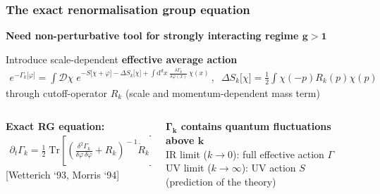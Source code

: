 \documentclass[]{beamer}  %
\begin{document}
\begin{frame}
  \frametitle{The exact renormalisation group equation}

  \begin{center}
    \textbf{
      Need non-perturbative tool for strongly interacting regime $\mathbf{g>1}$
    }
  \end{center}

  Introduce scale-dependent \textbf{effective average action}
  \begin{align*}
    e^{ - \Gamma_k \lbrack \varphi \rbrack }
    = \int \mathcal D \chi \;
    e^{
      - S \lbrack \chi + \varphi \rbrack
      - \Delta S_k \lbrack \chi \rbrack
      + \int \mathrm d^dx \;
      \frac{ \delta \Gamma_k }{ \delta \varphi (x) }
      \, \chi(x)
    } \,, \;\;
   \Delta S_k \lbrack \chi \rbrack =
   \frac 12 \int \chi(-p) R_k(p) \chi(p)
  \end{align*}
  through cutoff-operator $R_k$ (scale and momentum-dependent mass term)

  \vspace{30pt}
  \begin{columns}[T]
    \begin{column}{.5\textwidth}
      \textbf{Exact RG equation:}\\[3pt]
      \begin{align*}
        \boxed{
          \partial_t \Gamma_k
          = \frac 12 \; \mathrm{Tr}
          \left[
            \left(
              \frac{ \delta^2 \Gamma_k }{ \delta \varphi \, \delta \varphi } + R_k
            \right) ^{\!\!-1}
            \! \dot R_k
          \right]
        }
      \end{align*}
      \hfill [Wetterich `93, Morris `94]
    \end{column}
    \begin{column}{.5\textwidth}
        \textbf{
          $\mathbf{\Gamma_k}$ contains quantum fluctuations above $\mathbf{k}$
        }\\[10pt]

        IR limit ($k \rightarrow 0$): full effective action $\Gamma$\\[5pt]
        UV limit ($k \rightarrow \infty$): UV action $S$\\
        \hfill (prediction of the theory)
    \end{column}
  \end{columns}
\end{frame}
\end{document}
